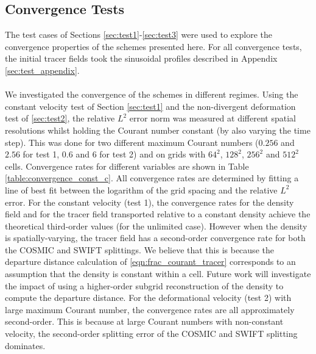 \documentclass[11pt,a4paper]{article}
\begin{document}
\subsection{Convergence Tests} \label{sec:convergence}
The test cases of Sections \ref{sec:test1}-\ref{sec:test3} were used to explore the convergence properties of the schemes presented here.
For all convergence tests, the initial tracer fields took the sinusoidal profiles described in Appendix \ref{sec:test_appendix}. \\
\\
We investigated the convergence of the schemes in different regimes.
Using the constant velocity test of Section \ref{sec:test1} and the non-divergent deformation test of \ref{sec:test2}, the relative $L^2$ error norm was measured at different spatial resolutions whilst holding the Courant number constant (by also varying the time step).
This was done for two different maximum Courant numbers ($0.256$ and $2.56$ for test 1, $0.6$ and $6$ for test 2) and on grids with $64^2$, $128^2$, $256^2$ and $512^2$ cells.
Convergence rates for different variables are shown in Table \ref{table:convergence_const_c}.
All convergence rates are determined by fitting a line of best fit between the logarithm of the grid spacing and the relative $L^2$ error.
For the constant velocity (test 1), the convergence rates for the density field and for the tracer field transported relative to a constant density achieve the theoretical third-order values (for the unlimited case).
However when the density is spatially-varying, the tracer field has a second-order convergence rate for both the COSMIC and SWIFT splittings.
We believe that this is because the departure distance calculation of \eqref{eqn:frac_courant_tracer} corresponds to an assumption that the density is constant within a cell.
Future work will investigate the impact of using a higher-order subgrid reconstruction of the density to compute the departure distance.
For the deformational velocity (test 2) with large maximum Courant number, the convergence rates are all approximately second-order. This is because at large Courant numbers with non-constant velocity, the second-order splitting error of the COSMIC and SWIFT splitting dominates. 
\\
\end{document}
